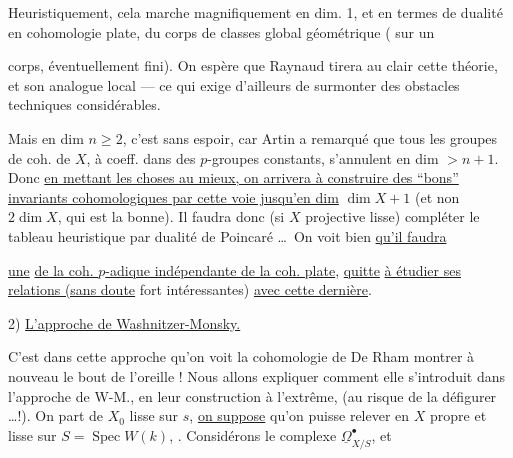 Heuristiquement, cela marche magnifiquement en dim. 1, et    en termes  de dualité en cohomologie plate, du corps de classes global géométrique ( sur un



corps, éventuellement fini). On espère que Raynaud tirera au clair cette théorie, et son analogue local --- ce qui exige d'ailleurs de surmonter des obstacles techniques considérables.

Mais en dim $n\geq 2$, c'est sans espoir, car Artin a remarqué que tous les  groupes de coh. de $X$, à coeff. dans des $p$-groupes constants, s'annulent en dim $>n+1$. Donc \uline{en mettant les choses au mieux, on arrivera à construire des ``bons'' invariants cohomologiques par cette voie jusqu'en dim} $\dim X+1$ (et non $2\dim X$, qui est la bonne). Il faudra donc (si $X$ projective lisse)  compléter le tableau  heuristique par dualité de Poincaré \ldots\ On voit bien \uline{qu'il faudra}



\uline{une}  \uline{de la coh. $p$-adique indépendante de la coh. plate}, \uline{quitte}  \uline{à étudier ses relations (sans doute} fort intéressantes) \uline{avec cette dernière}.

2) \uline{L'approche de Washnitzer-Monsky.}

C'est dans cette approche qu'on voit la cohomologie de De Rham  montrer à nouveau le bout de l'oreille ! Nous allons expliquer  comment elle s'introduit dans l'approche de W-M., en  leur construction à l'extrême, (au risque de la défigurer \ldots !). On part de $X_0$  lisse sur $s$, \uline{on suppose}  qu'on puisse relever en $X$  propre et lisse sur $S=\operatorname{Spec}W(k)$, . Considérons le complexe $\underline{\Omega}_{X/S}^{\bullet}$, et


